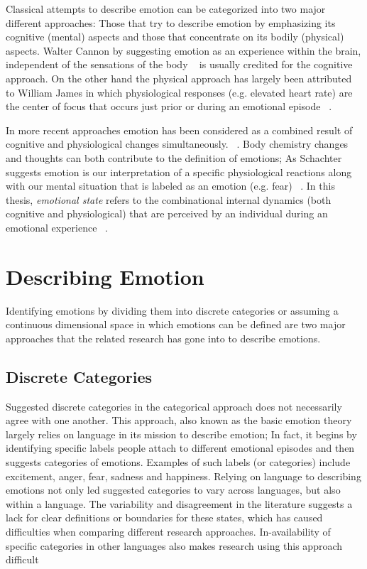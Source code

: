 Classical attempts to describe emotion can be categorized into two major different approaches: Those that try to describe emotion by emphasizing its cognitive (mental) aspects and those that concentrate on its bodily (physical) aspects. Walter Cannon by suggesting emotion as an experience within the brain, independent of the sensations of the body ~\cite{cannon1927james} is usually credited for the cognitive approach. On the other hand the physical approach has largely been attributed to William James in which physiological responses (e.g. elevated heart rate) are the center of focus that occurs just prior or during an emotional episode ~\cite{paiva2007affective}.

In more recent approaches emotion has been considered as a combined result of cognitive and physiological changes simultaneously. ~\cite{paiva2007affective}. Body chemistry changes and thoughts can both contribute to the definition of emotions; As Schachter suggests emotion is our interpretation of a specific physiological reactions along with our mental situation that is labeled as an emotion (e.g. fear) ~\cite{schachter1964interaction}. In this thesis, \textit{emotional state} refers to the combinational internal dynamics (both cognitive and physiological) that are perceived by an individual during an emotional experience ~\cite{paiva2007affective}.

\section{Describing Emotion}

Identifying emotions by dividing them into discrete categories or assuming a continuous dimensional space in which emotions can be defined are two major approaches that the related research has gone into to describe emotions.

\subsection{Discrete Categories}

Suggested discrete categories in the categorical approach does not necessarily agree with one another. This approach, also known as the basic emotion theory largely relies on language in its mission to describe emotion; In fact, it begins by identifying specific labels people attach to different emotional episodes and then suggests categories of emotions. Examples of such labels (or categories) include excitement, anger, fear, sadness and happiness. Relying on language to describing emotions not only led suggested categories to vary across languages, but also within a language. The variability and disagreement in the literature suggests a lack for clear definitions or boundaries for these states, which has caused difficulties when comparing different research approaches. In-availability of specific categories in other languages also makes research using this approach difficult ~\cite{zimmermann2006extending}

